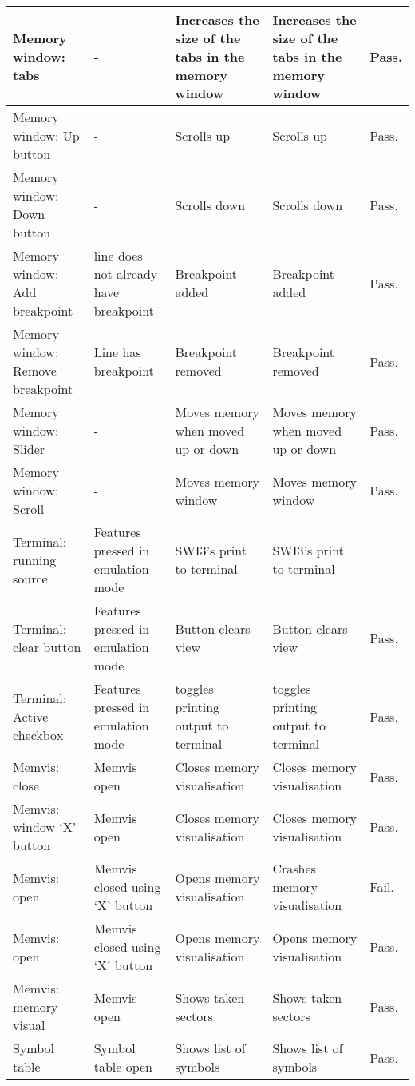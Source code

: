 \begin{landscape}
\begin{center}
\begin{tabular}{ | @{\makebox[2em][c]{\rownumber\space}} | p{4cm} |  p{5cm} | p{5cm} | p{5cm} | l |}
      Memory window: tabs & - & Increases the size of the tabs in the memory window & Increases the size of the tabs in the memory window & Pass. \\ \hline
      Memory window: Up button & - & Scrolls up & Scrolls up & Pass. \\ \hline
      Memory window: Down button & - & Scrolls down & Scrolls down & Pass. \\ \hline
      Memory window: Add breakpoint & line does not already have breakpoint & Breakpoint added & Breakpoint added & Pass.\\ \hline
      Memory window: Remove breakpoint & Line has breakpoint & Breakpoint removed & Breakpoint removed & Pass.\\ \hline
      Memory window: Slider & - & Moves memory when moved up or down & Moves memory when moved up or down & Pass.\\ \hline
      Memory window: Scroll & - & Moves memory window & Moves memory window & Pass.\\ \hline
      Terminal: running source & Features pressed in emulation mode & SWI3's print to terminal & SWI3's print to terminal & \\ \hline
      Terminal: clear button & Features pressed in emulation mode & Button clears view & Button clears view & Pass.\\ \hline
      Terminal: Active checkbox & Features pressed in emulation mode & toggles printing output to terminal & toggles printing output to terminal & Pass.\\ \hline
      Memvis: close & Memvis open & Closes memory visualisation & Closes memory visualisation & Pass.\\ \hline
			Memvis: window `X' button & Memvis open & Closes memory visualisation & Closes memory visualisation & Pass.\\ \hline
			Memvis: open & Memvis closed using `X' button & Opens memory visualisation & Crashes memory visualisation & Fail.\\ \hline
			Memvis: open & Memvis closed using `X' button & Opens memory visualisation & Opens memory visualisation & Pass.\\ \hline
      Memvis: memory visual & Memvis open & Shows taken sectors & Shows taken sectors & Pass.\\ \hline
      Symbol table & Symbol table open & Shows list of symbols & Shows list of symbols & Pass.\\ \hline

\end{tabular}
\end{center}
\end{landscape}
